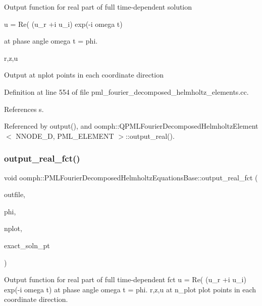 Output function for real part of full time-\/dependent solution

u = Re( (u\+\_\+r +i u\+\_\+i) exp(-\/i omega t)

at phase angle omega t = phi.

r,z,u

Output at nplot points in each coordinate direction 

Definition at line 554 of file pml\+\_\+fourier\+\_\+decomposed\+\_\+helmholtz\+\_\+elements.\+cc.



References s.



Referenced by output(), and oomph\+::\+Q\+P\+M\+L\+Fourier\+Decomposed\+Helmholtz\+Element$<$ N\+N\+O\+D\+E\+\_\+D, P\+M\+L\+\_\+\+E\+L\+E\+M\+E\+N\+T $>$\+::output\+\_\+real().

\mbox{\label{classoomph_1_1PMLFourierDecomposedHelmholtzEquationsBase_a40f2098b3f58dd2414e9de4ab4966a61}} 
\subsubsection{\texorpdfstring{output\+\_\+real\+\_\+fct()}{output\_real\_fct()}}
{\footnotesize\ttfamily void oomph\+::\+P\+M\+L\+Fourier\+Decomposed\+Helmholtz\+Equations\+Base\+::output\+\_\+real\+\_\+fct (\begin{DoxyParamCaption}\item[{std\+::ostream \&}]{outfile,  }\item[{const double \&}]{phi,  }\item[{const unsigned \&}]{nplot,  }\item[{\hyperlink{classoomph_1_1FiniteElement_a690fd33af26cc3e84f39bba6d5a85202}{Finite\+Element\+::\+Steady\+Exact\+Solution\+Fct\+Pt}}]{exact\+\_\+soln\+\_\+pt }\end{DoxyParamCaption})}



Output function for real part of full time-\/dependent fct u = Re( (u\+\_\+r +i u\+\_\+i) exp(-\/i omega t) at phase angle omega t = phi. r,z,u at n\+\_\+plot plot points in each coordinate direction. 

